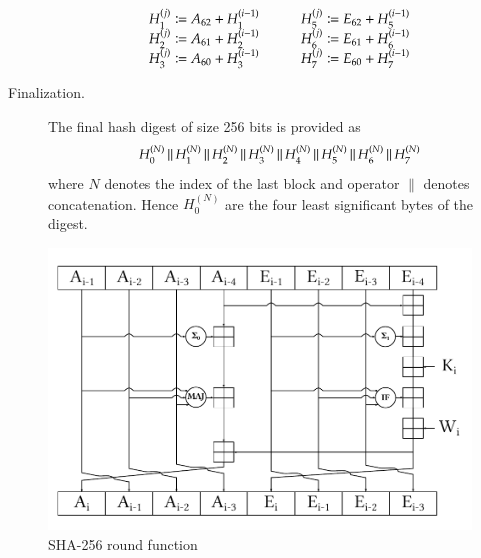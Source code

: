 \begin{description}
\[\begin{array}{lp{10pt}r}
        H_1^{(j)} \coloneqq A_{62} + H_1^{(i-1)}  & &  H_5^{(j)} \coloneqq E_{62} + H_5^{(i-1)} \\
        H_2^{(j)} \coloneqq A_{61} + H_2^{(i-1)}  & &  H_6^{(j)} \coloneqq E_{61} + H_6^{(i-1)} \\
        H_3^{(j)} \coloneqq A_{60} + H_3^{(i-1)}  & &  H_7^{(j)} \coloneqq E_{60} + H_7^{(i-1)}
      \end{array}
    \]
  \item[Finalization.]
    The final hash digest of size 256 bits is provided as
    \[
      H_0^{(N)} \,\|\,
      H_1^{(N)} \,\|\,
      H_2^{(N)} \,\|\,
      H_3^{(N)} \,\|\,
      H_4^{(N)} \,\|\,
      H_5^{(N)} \,\|\,
      H_6^{(N)} \,\|\,
      H_7^{(N)}
    \]
    where $N$ denotes the index of the last block and operator $\|$ denotes
    concatenation. Hence $H_0^{(N)}$ are the four least significant bytes of the digest.
\end{description}

\begin{figure}[ht]
  \begin{center}
    \includegraphics[width=\textwidth]{img/sha256.pdf}
    \caption{SHA-256 round function~\cite{analysisSHA256}}
    \label{fig:sha256-round-function}
  \end{center}
\end{figure}
